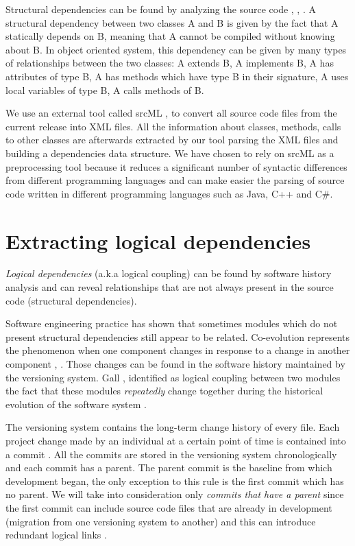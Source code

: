 \documentclass[12pt]{mitthesis}
\begin{document}
Structural dependencies can be found by analyzing the source code \cite{Sangal:2005:UDM:1094811.1094824}, \cite{CalloArias2011}, \cite{structdep}. A structural dependency between two classes A and B is given by the fact that A statically depends on B, meaning that A cannot be compiled without knowing about B. In object oriented system, this dependency can be given by many types of relationships between the two classes: A extends B, A implements B, A has attributes of type B, A has methods which have type B in their signature, A uses local variables of type B, A calls methods of B.


 We use an external tool called srcML \cite{2003:XLC:851042.857028},
\cite{Collard:2011:LTF:2067850.2068011} to convert all source code files from the current release into XML files. All the information about classes, methods, calls to other classes are afterwards extracted by our tool parsing the XML files and building a dependencies data structure. We have chosen to rely on srcML as a preprocessing tool because it reduces a significant number of syntactic differences from different programming languages and can make easier the parsing of source code written in different programming languages such as Java, C++ and C\#.    

\section{Extracting logical dependencies}

\textit{Logical dependencies} (a.k.a logical coupling) can be found by software history analysis and can reveal relationships that are not always present in the source code (structural dependencies).  

Software engineering practice has shown that sometimes modules which do not present structural dependencies still appear to be related. Co-evolution represents the phenomenon when one component changes in response to a change in another component \cite{Yu:2007:UCC:1231330.1231370}, \cite{5166450}. Those changes can be found in the software history maintained by the versioning system. Gall \cite{Gall:1998:DLC:850947.853338}, \cite{Gall:2003:CRH:942803.943741} identified as logical coupling between two modules the fact that these modules  \textit{repeatedly} change together during the historical evolution of the software system \cite{6606615}.

The versioning system contains the long-term change history of every file. Each project change made by an individual at a certain point of time is contained into a commit \cite{svn}. All the commits are stored in the versioning system chronologically and each commit has a parent. The parent commit is the baseline from which development began, the only exception to this rule is the first commit which has no parent. We will take into consideration only \textit{commits that have a parent} since the first commit can include source code files that are already in development (migration from one versioning system to another) and this can introduce redundant logical links \cite{DBLP:journals/jss/AjienkaC17}. 
\end{document}
